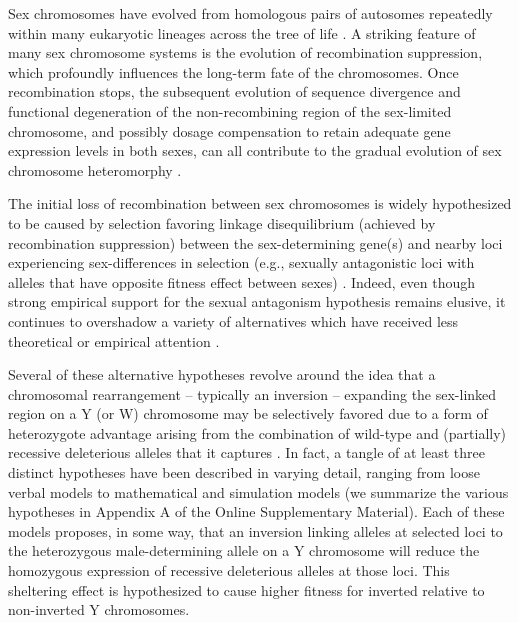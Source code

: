 \documentclass[11pt]{article}
\begin{document}
Sex chromosomes have evolved from homologous pairs of autosomes repeatedly within many eukaryotic lineages across the tree of life \citep{BeukeboomPerrin2014,Bachtrog2014}. A striking feature of many sex chromosome systems is the evolution of recombination suppression, which profoundly influences the long-term fate of the chromosomes. Once recombination stops, the subsequent evolution of sequence divergence and functional degeneration of the non-recombining region of the sex-limited chromosome, and possibly dosage compensation to retain adequate gene expression levels in both sexes, can all contribute to the gradual evolution of sex chromosome heteromorphy \citep{Bull1983,Rice1987,Rice1996,Bachtrog2006,CharlesworthEtAl2005,BeukeboomPerrin2014}. 

The initial loss of recombination between sex chromosomes is widely hypothesized to be caused by selection favoring linkage disequilibrium (achieved by recombination suppression) between the sex-determining gene(s) and nearby loci experiencing sex-differences in selection (e.g., sexually antagonistic loci with alleles that have opposite fitness effect between sexes) \citep{Bull1983,Rice1987,Rice1996,Lenormand2003,Otto2019}. Indeed, even though strong empirical support for the sexual antagonism hypothesis remains elusive, it continues to overshadow a variety of alternatives which have received less theoretical or empirical attention \citep{Ponnikas2018, OlitoAbbott2020,Jefferies2021,LenormandRoze2021}. 

Several of these alternative hypotheses revolve around the idea that a chromosomal rearrangement – typically an inversion – expanding the sex-linked region on a Y (or W) chromosome may be selectively favored due to a form of heterozygote advantage arising from the combination of wild-type and (partially) recessive deleterious alleles that it captures \citep{Ironside2010,Ponnikas2018,Branco2017,Jay2021}. In fact, a tangle of at least three distinct hypotheses have been described in varying detail, ranging from loose verbal models to mathematical and simulation models (we summarize the various hypotheses in Appendix A of the Online Supplementary Material). Each of these models proposes, in some way, that an inversion linking alleles at selected loci to the heterozygous male-determining allele on a Y chromosome will reduce the homozygous expression of recessive deleterious alleles at those loci. This sheltering effect is hypothesized to cause higher fitness for inverted relative to non-inverted Y chromosomes. 
\end{document}
